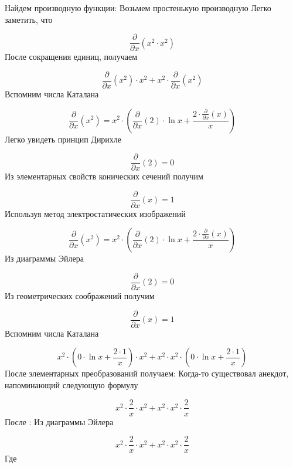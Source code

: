 \documentclass{article}
\begin{document}
Найдем производную функции:
Возьмем простенькую производную
Легко заметить, что

        \begin{equation}
\frac{\partial}{\partial x}(x^{2}\cdot x^{2})
        \end{equation}
После сокращения единиц, получаем

        \begin{equation}
\frac{\partial}{\partial x}(x^{2})\cdot x^{2}+x^{2}\cdot \frac{\partial}{\partial x}(x^{2})
        \end{equation}
Вспомним числа Каталана

        \begin{equation}
\frac{\partial}{\partial x}(x^{2})=x^{2}\cdot (\frac{\partial}{\partial x}(2)\cdot \ln{x}+\frac{2\cdot \frac{\partial}{\partial x}(x)}{x})
        \end{equation}
Легко увидеть принцип Дирихле

        \begin{equation}
\frac{\partial}{\partial x}(2)=0
        \end{equation}
Из элементарных свойств конических сечений получим

        \begin{equation}
\frac{\partial}{\partial x}(x)=1
        \end{equation}
Используя метод электростатических изображений

        \begin{equation}
\frac{\partial}{\partial x}(x^{2})=x^{2}\cdot (\frac{\partial}{\partial x}(2)\cdot \ln{x}+\frac{2\cdot \frac{\partial}{\partial x}(x)}{x})
        \end{equation}
Из диаграммы Эйлера

        \begin{equation}
\frac{\partial}{\partial x}(2)=0
        \end{equation}
Из геометрических соображений получим

        \begin{equation}
\frac{\partial}{\partial x}(x)=1
        \end{equation}
Вспомним числа Каталана

        \begin{equation}
x^{2}\cdot (0\cdot \ln{x}+\frac{2\cdot 1}{x})\cdot x^{2}+x^{2}\cdot x^{2}\cdot (0\cdot \ln{x}+\frac{2\cdot 1}{x})
        \end{equation}
После элементарных преобразований получаем:
Когда-то существовал анекдот, напоминающий следующую формулу

        \begin{equation}
x^{2}\cdot \frac{2}{x}\cdot x^{2}+x^{2}\cdot x^{2}\cdot \frac{2}{x}
        \end{equation}
После :
Из диаграммы Эйлера

        \begin{equation}
x^{2}\cdot \frac{2}{x}\cdot x^{2}+x^{2}\cdot x^{2}\cdot \frac{2}{x}
        \end{equation}
Где

        
\end{document}
